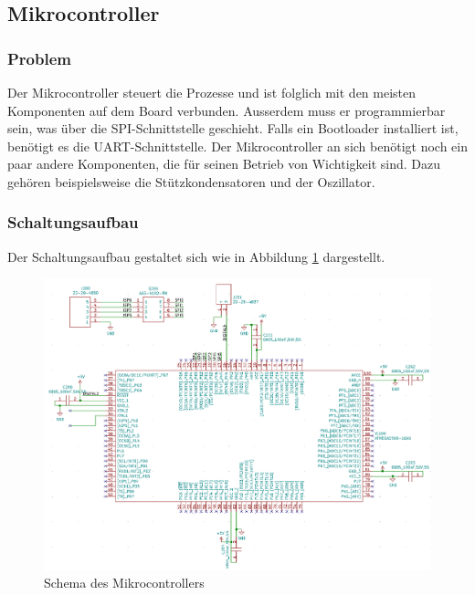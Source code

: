 \subsection{Mikrocontroller}\label{subsubsec:Detailkonzept_Mikrocontroller}

\subsubsection{Problem}\label{subsubsec:Problem_Mikrocontroller}

Der Mikrocontroller steuert die Prozesse und ist folglich mit den meisten Komponenten auf dem Board verbunden. Ausserdem muss er programmierbar sein, was über die SPI-Schnittstelle geschieht. Falls ein Bootloader installiert ist, benötigt es die UART-Schnittstelle. Der Mikrocontroller an sich benötigt noch ein paar andere Komponenten, die für seinen Betrieb von Wichtigkeit sind. Dazu gehören beispielsweise die Stützkondensatoren und der Oszillator.

\subsubsection{Schaltungsaufbau}\label{subsubsec:Schaltungsaufbau_Mikrocontroller}

Der Schaltungsaufbau gestaltet sich wie in Abbildung \ref{fig:Schema_Mikrocontroller} dargestellt. 

\begin{figure}[h!]
\centering
\includegraphics[width=\textwidth]{graphics/Schema_Atmega2560.png}
\caption{Schema des Mikrocontrollers}
\label{fig:Schema_Mikrocontroller}
\end{figure}
\newpage
